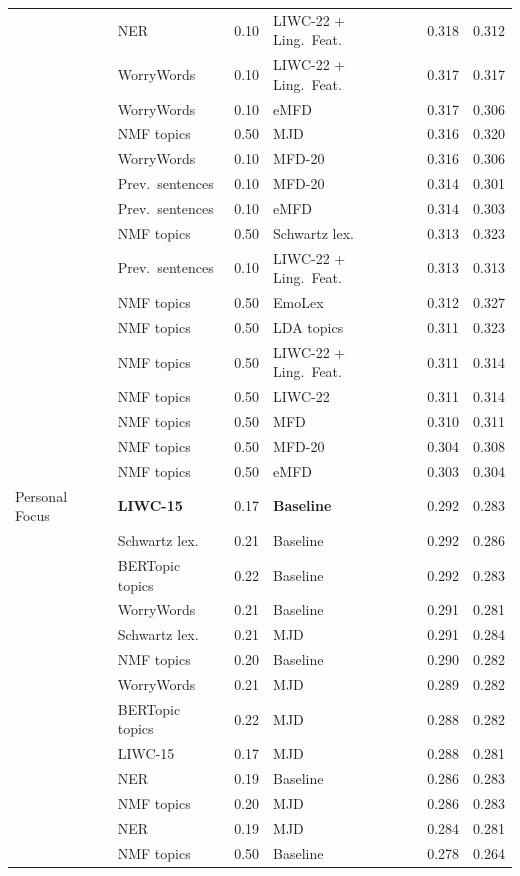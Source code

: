 {\begin{longtable}{llclcc}
 & NER & 0.10 & LIWC-22 + Ling.\ Feat. & 0.318 & 0.312 \\
 & WorryWords & 0.10 & LIWC-22 + Ling.\ Feat. & 0.317 & 0.317 \\
 & WorryWords & 0.10 & eMFD & 0.317 & 0.306 \\
 & NMF topics & 0.50 & MJD & 0.316 & 0.320 \\
 & WorryWords & 0.10 & MFD-20 & 0.316 & 0.306 \\
 & Prev.\ sentences & 0.10 & MFD-20 & 0.314 & 0.301 \\
 & Prev.\ sentences & 0.10 & eMFD & 0.314 & 0.303 \\
 & NMF topics & 0.50 & Schwartz lex. & 0.313 & 0.323 \\
 & Prev.\ sentences & 0.10 & LIWC-22 + Ling.\ Feat. & 0.313 & 0.313 \\
 & NMF topics & 0.50 & EmoLex & 0.312 & 0.327 \\
 & NMF topics & 0.50 & LDA topics & 0.311 & 0.323 \\
 & NMF topics & 0.50 & LIWC-22 + Ling.\ Feat. & 0.311 & 0.314 \\
 & NMF topics & 0.50 & LIWC-22 & 0.311 & 0.314 \\
 & NMF topics & 0.50 & MFD & 0.310 & 0.311 \\
 & NMF topics & 0.50 & MFD-20 & 0.304 & 0.308 \\
 & NMF topics & 0.50 & eMFD & 0.303 & 0.304 \\
Personal Focus & \textbf{LIWC-15} & 0.17 & \textbf{Baseline} & 0.292 & 0.283 \\
 & Schwartz lex. & 0.21 & Baseline & 0.292 & 0.286 \\
 & BERTopic topics & 0.22 & Baseline & 0.292 & 0.283 \\
 & WorryWords & 0.21 & Baseline & 0.291 & 0.281 \\
 & Schwartz lex. & 0.21 & MJD & 0.291 & 0.284 \\
 & NMF topics & 0.20 & Baseline & 0.290 & 0.282 \\
 & WorryWords & 0.21 & MJD & 0.289 & 0.282 \\
 & BERTopic topics & 0.22 & MJD & 0.288 & 0.282 \\
 & LIWC-15 & 0.17 & MJD & 0.288 & 0.281 \\
 & NER & 0.19 & Baseline & 0.286 & 0.283 \\
 & NMF topics & 0.20 & MJD & 0.286 & 0.283 \\
 & NER & 0.19 & MJD & 0.284 & 0.281 \\
 & NMF topics & 0.50 & Baseline & 0.278 & 0.264 \\

\end{longtable}}
